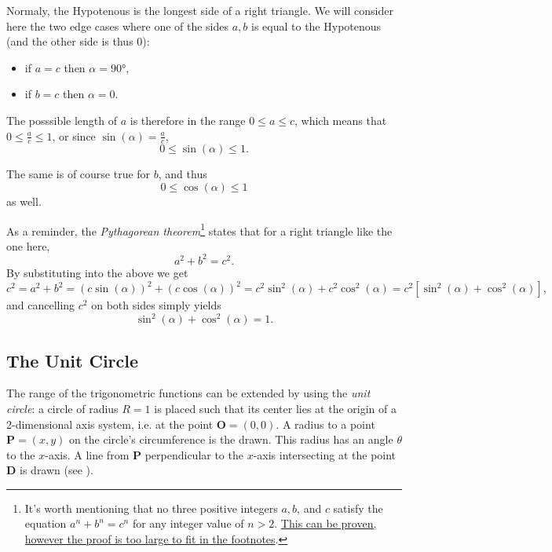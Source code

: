 Normaly, the Hypotenous is the longest side of a right triangle. We will consider here the two edge cases where one of the sides $a,b$ is equal to the Hypotenous (and the other side is thus $0$):
\begin{itemize}
	\item if $a=c$ then $\alpha=\ang{90}$,\
	\item if $b=c$ then $\alpha=0$.
\end{itemize}

The posssible length of $a$ is therefore in the range $0\leq a \leq c$, which means that $0\leq \frac{a}{c} \leq 1$, or since $\sin(\alpha)=\frac{a}{c}$,
\begin{equation}
	0\leq \sin(\alpha) \leq1.
	\label{eq:img_sin}
\end{equation}

The same is of course true for $b$, and thus
\begin{equation}
	0\leq \cos(\alpha) \leq1
	\label{eq:img_cos}
\end{equation}
as well.

As a reminder, the \emph{Pythagorean theorem}\footnote{It's worth mentioning that no three positive integers $a, b$, and $c$ satisfy the equation $a^{n}+b^{n}=c^{n}$ for any integer value of $n>2$. \href{https://en.wikipedia.org/wiki/Fermat\%27s_Last_Theorem}{This can be proven, however the proof is too large to fit in the footnotes}.} states that for a right triangle like the one here,
\begin{equation}
	a^{2} + b^{2} = c^{2}.
	\label{eq:pythagorean_theorem}
\end{equation}
By substituting  into the above we get
\begin{equation*}
	c^{2} = a^{2}+b^{2} = \left( c\sin(\alpha) \right)^{2} + \left( c\cos(\alpha) \right)^{2} = c^{2}\sin^{2}(\alpha) + c^{2}\cos^{2}(\alpha) = c^{2}\left[ \sin^{2}(\alpha) + \cos^{2}(\alpha) \right],
\end{equation*}
and cancelling $c^{2}$ on both sides simply yields
\begin{equation}
	\sin^{2}(\alpha) + \cos^{2}(\alpha) = 1.
	\label{eq:sin2_cos2_1}
\end{equation}

\subsection{The Unit Circle}
The range of the trigonometric functions can be extended by using the \emph{unit circle}: a circle of radius $R=1$ is placed such that its center lies at the origin of a 2-dimensional axis system, i.e. at the point $\bm{O}=(0,0)$. A radius to a point $\bm{P}=(x,y)$ on the circle's circumference is the drawn. This radius has an angle $\theta$ to the $x$-axis. A line from $\bm{P}$ perpendicular to the $x$-axis intersecting at the point $\bm{D}$ is drawn (see ).

